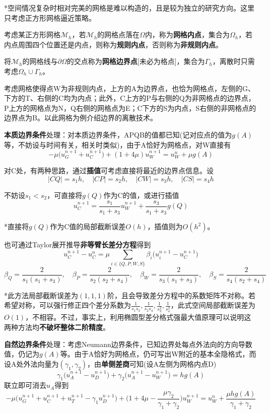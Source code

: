 \documentclass[a4paper,UTF8,fontset=windows]{ctexart}
\begin{document}
*空间情况复杂时相对完美的网格是难以构造的，且是较为独立的研究方向。这里只考虑正方形网格逼近策略。

考虑某正方形网格$\mathcal{M}_h$，若$\mathcal{M}_h$的网格点落在$\Omega$内，称为\textbf{网格内点}，集合为$\Omega_h$，若内点周围四个位置还是内点，则称为\textbf{规则内点}，否则称为\textbf{非规则内点}。

将$\mathcal{M}_h$的网格线与$\partial\Omega$的交点称为\textbf{网格边界点}[未必为格点]，集合为$\Gamma_h$，离散时只需考虑$\Omega_h\cup\Gamma_h$。

考虑网格使得点W为非规则内点，上方的A为边界点，也恰为网格点，左侧的G、下方的T、右侧的C均为内点；此外，C上方的P与右侧的Q为非网格点的边界点，P上方的网格点为N，Q右侧的网格点为E；C下方的S为内点，S右侧的非网格点的边界点为B。以此网格为例介绍边界的离散技术。

\textbf{本质边界条件}处理：对本质边界条件，APQB的值都已知(记对应点的值为$g(A)$等，不妨设与时间有关，相关时类似)，由于A恰好为网格点，对W直接有
$$-\mu\big(u_G^{n+1}+u_C^{n+1}\big)+(1+4\mu)u_W^{n+1}=u_W^n+\mu g(A)$$

对C处，有两种思路，通过\textbf{插值}可考虑直接将最近的边界点信息。设
$$|CQ|=s_1h,\quad|CP|=s_2h,\quad|CW|=s_3h,\quad|CS|=s_4h$$

不妨设$s_1<s_2$，可直接将$g(Q)$作为C的值，或进行插值
$$u_C^{n+1}=\frac{s_1}{s_1+s_3}u_W^{n+1}+\frac{s_3}{s_1+s_3}g(Q)$$

*直接将$g(Q)$作为C值的局部截断误差$O(h)$，插值则为$O(h^2)$。

也可通过Taylor展开推导\textbf{非等臂长差分方程}得到
$$u_C^{n+1}-u_C^n=\mu\sum_{i\in\{Q,P,W,S\}}\beta_i\big(u_i^{n+1}-u_C^{n+1}\big)$$
$$\beta_Q=\frac{2}{s_1(s_1+s_3)},\quad\beta_P=\frac{2}{s_2(s_2+s_4)},\quad\beta_W=\frac{2}{s_3(s_1+s_3)},\quad\beta_S=\frac{2}{s_4(s_2+s_4)}$$

*此方法局部截断误差为$(1,1,1)$阶，且会导致差分方程中的系数矩阵不对称。若希望对称，可以强行修正四个差分系数为$\frac{1}{s_1s_3},\frac{1}{s_2s_4},\frac{1}{s_3^2},\frac{1}{s_4^2}$，此式空间局部截断误差为$O(1)$，不相容。不过，事实上，利用椭圆型差分格式强最大值原理可以说明这两种方法均\textbf{不破坏整体二阶精度}。

\textbf{自然边界条件}处理：考虑Neumann边界条件，已知边界处每点外法向的方向导数值，仍记为$g(A)$等。由于A恰好为网格点，仍可写出W附近的基本全隐格式，而设A处外法向量为$(\gamma_1,\gamma_2)$，由\textbf{单侧差商}可知(设A左侧为网格内点D)
$$\gamma_1\big(u_A^{n+1}-u_D^{n+1}\big)+\gamma_2\big(u_A^{n+1}-u_W^{n+1}\big)=hg(A)$$
联立即可消去$u_A$得到
$$-\mu\big(u_G^{n+1}+u_C^{n+1}+u_T^{n+1}-\gamma_1u_D^{n+1}\big)+\bigg(1+4\mu-\frac{\mu\gamma_2}{\gamma_1+\gamma_2}\bigg)u_W^{n+1}=u_W^n+\frac{\mu hg(A)}{\gamma_1+\gamma_2}$$
\end{document}
